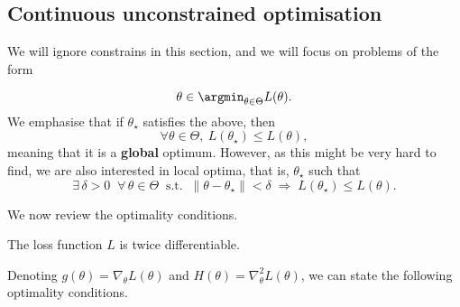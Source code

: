 \begin{mdframed}[style=ejemplo, frametitle={\center Example: XXX}]

\end{mdframed}


\subsection{Continuous unconstrained optimisation} %
\label{sec:continuous_optimisation}

We will ignore constrains in this section, and we will focus on problems of the form

\begin{equation}
	\theta \in \argmin_{\theta\in\Theta} L(\theta).
\end{equation}
We emphasise that if $\theta_\star$ satisfies the above, then
\begin{equation}
	\forall \theta\in\Theta,~ L(\theta_\star) \leq L(\theta),
\end{equation}
meaning that it is a \textbf{global} optimum. However, as this might be very hard to find, we are also interested in local optima, that is, $\theta_\star$  such that 
\begin{equation}
\exists\, \delta > 0 \;\; \forall\, \theta \in \Theta \;\; 
\text{s.t.} \;\; 
\|\theta - \theta_\star\| < \delta 
\;\Rightarrow\;
L(\theta_\star) \le L(\theta).
\end{equation}

We now review the optimality conditions.

\begin{assumption}
The loss function $L$ is twice differentiable.
\end{assumption}

Denoting $g(\theta) = \nabla_\theta L(\theta)$ and $H(\theta) = \nabla_\theta^2L(\theta)$, we can state the following optimality conditions. 

